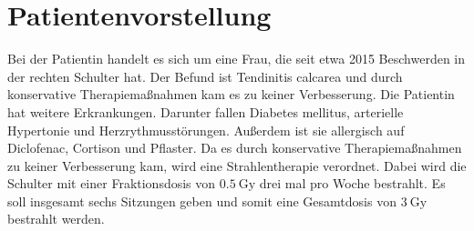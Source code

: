 \section{Patientenvorstellung}

Bei der Patientin handelt es sich um eine Frau, die seit etwa 2015 Beschwerden in der
rechten Schulter hat. Der Befund ist Tendinitis calcarea und durch konservative Therapiemaßnahmen
kam es zu keiner Verbesserung. Die Patientin hat weitere Erkrankungen. Darunter fallen
Diabetes mellitus, arterielle Hypertonie und Herzrythmusstörungen. Außerdem ist sie
allergisch auf Diclofenac, Cortison und Pflaster. Da es durch konservative Therapiemaßnahmen
zu keiner Verbesserung kam, wird eine Strahlentherapie verordnet. Dabei wird die Schulter
mit einer Fraktionsdosis von $\SI{0.5}{\gray}$ drei mal pro Woche bestrahlt. Es soll
insgesamt sechs Sitzungen geben und somit eine Gesamtdosis von $\SI{3}{\gray}$ bestrahlt werden.
